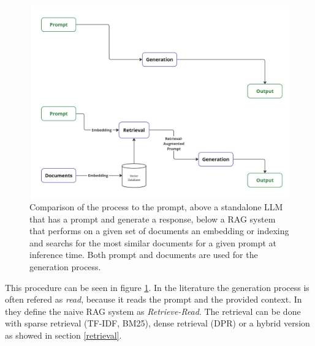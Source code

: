 \begin{figure}[h!]
    \centering
    \includegraphics[width=\textwidth]{images/LLM-vs-RAG.jpg}
    \caption{Comparison of the process to the prompt, above a standalone LLM that has a prompt and generate a response, below a RAG system that performs on a given set of documents an embedding or indexing and searchs for the most similar documents for a given prompt at inference time. Both prompt and documents are used for the generation process.}
    \label{fig:naive_rag}
\end{figure}

This procedure can be seen in figure \ref{fig:naive_rag}. In the literature the generation process is often refered as \textit{read}, because it reads the prompt and the provided context. In \citet{Gao.18.12.2023} they define the naive RAG system as \textit{Retrieve-Read}. The retrieval can be done with sparse retrieval (TF-IDF, BM25), dense retrieval (DPR) or a hybrid version as showed in section \ref{retrieval}. 

